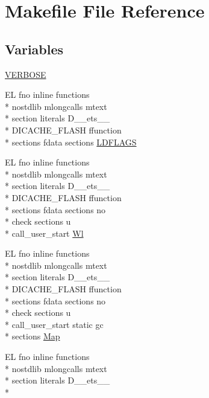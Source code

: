 \hypertarget{Makefile}{\section{Makefile File Reference}
\label{Makefile}
}
\subsection*{Variables}
\begin{DoxyCompactItemize}
\item 
\hyperlink{Makefile_a03169c2c7e2ff706233c78422b0daf3a}{V\-E\-R\-B\-O\-S\-E}
\item 
E\-L fno inline functions \\*
nostdlib mlongcalls mtext \\*
section literals D\-\_\-\-\_\-ets\-\_\-\-\_\- \\*
D\-I\-C\-A\-C\-H\-E\-\_\-\-F\-L\-A\-S\-H ffunction \\*
sections fdata sections \hyperlink{Makefile_a0b0ec95cdd594ae63274ea3aa92e8bac}{L\-D\-F\-L\-A\-G\-S}
\item 
E\-L fno inline functions \\*
nostdlib mlongcalls mtext \\*
section literals D\-\_\-\-\_\-ets\-\_\-\-\_\- \\*
D\-I\-C\-A\-C\-H\-E\-\_\-\-F\-L\-A\-S\-H ffunction \\*
sections fdata sections no \\*
check sections u \\*
call\-\_\-user\-\_\-start \hyperlink{Makefile_a1af3a6ecef406b93f1a1db145b2cfd43}{Wl}
\item 
E\-L fno inline functions \\*
nostdlib mlongcalls mtext \\*
section literals D\-\_\-\-\_\-ets\-\_\-\-\_\- \\*
D\-I\-C\-A\-C\-H\-E\-\_\-\-F\-L\-A\-S\-H ffunction \\*
sections fdata sections no \\*
check sections u \\*
call\-\_\-user\-\_\-start static gc \\*
sections \hyperlink{Makefile_a3d2682475b097eef42d87fa20f765794}{Map}
\item 
E\-L fno inline functions \\*
nostdlib mlongcalls mtext \\*
section literals D\-\_\-\-\_\-ets\-\_\-\-\_\- \\*

\end{DoxyCompactItemize}
